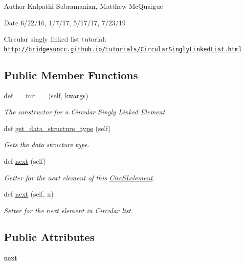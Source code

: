 \begin{DoxyAuthor}{Author}
Kalpathi Subramanian, Matthew Mc\+Quaigue
\end{DoxyAuthor}
\begin{DoxyDate}{Date}
6/22/16, 1/7/17, 5/17/17, 7/23/19
\end{DoxyDate}
Circular singly linked list tutorial\+: \href{http://bridgesuncc.github.io/tutorials/CircularSinglyLinkedList.html}{\tt http\+://bridgesuncc.\+github.\+io/tutorials/\+Circular\+Singly\+Linked\+List.\+html} \subsection*{Public Member Functions}
\begin{DoxyCompactItemize}
\item 
def \mbox{\hyperlink{classbridges_1_1circ__sl__element_1_1_circ_s_lelement_a8ffff39d70e7e94d8d8573e555a6ff35}{\+\_\+\+\_\+init\+\_\+\+\_\+}} (self, kwargs)
\begin{DoxyCompactList}\small\item\em The constructor for a Circular Singly Linked Element. \end{DoxyCompactList}\item 
def \mbox{\hyperlink{classbridges_1_1circ__sl__element_1_1_circ_s_lelement_a82b1dbb8592c943eb68161ee60ac3492}{get\+\_\+data\+\_\+structure\+\_\+type}} (self)
\begin{DoxyCompactList}\small\item\em Gets the data structure type. \end{DoxyCompactList}\item 
def \mbox{\hyperlink{classbridges_1_1circ__sl__element_1_1_circ_s_lelement_a5abc123aa4a20414a02785f3b1cc342a}{next}} (self)
\begin{DoxyCompactList}\small\item\em Getter for the next element of this \mbox{\hyperlink{classbridges_1_1circ__sl__element_1_1_circ_s_lelement}{Circ\+S\+Lelement}}. \end{DoxyCompactList}\item 
def \mbox{\hyperlink{classbridges_1_1circ__sl__element_1_1_circ_s_lelement_a0215303874e167e22f92e4adbdee1e84}{next}} (self, n)
\begin{DoxyCompactList}\small\item\em Setter for the next element in Circular list. \end{DoxyCompactList}\end{DoxyCompactItemize}
\subsection*{Public Attributes}
\begin{DoxyCompactItemize}
\item 
\mbox{\hyperlink{classbridges_1_1circ__sl__element_1_1_circ_s_lelement_afc8fa34bcbc539e7966db5ec471e3959}{next}}
\end{DoxyCompactItemize}

